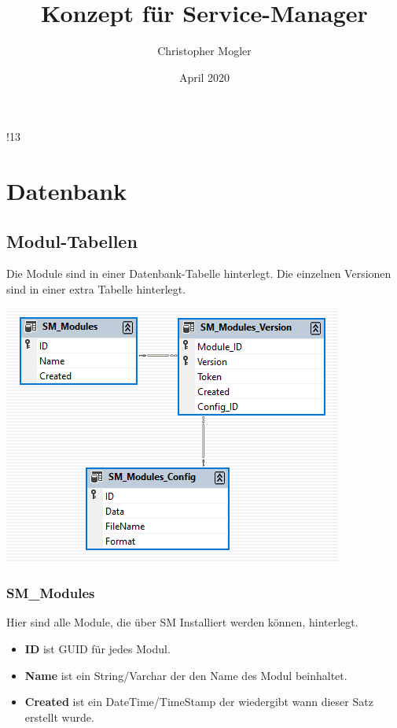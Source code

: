 \documentclass{article}
\title{Konzept für Service-Manager}
\author{Christopher Mogler}
\date{April 2020}
\begin{document}
\maketitle
\tableofcontentsFrankfurt!13

\newpage


\section{Datenbank}

\subsection{Modul-Tabellen}

Die Module sind in einer Datenbank-Tabelle hinterlegt. 
Die einzelnen Versionen sind in einer extra Tabelle hinterlegt.

\begin{center}
\includegraphics{db_modules}
\end{center}

\subsubsection{SM\_Modules}

Hier sind alle Module, die über SM Installiert werden können, hinterlegt.

\begin{itemize}
  \item \textbf{ID} ist GUID für jedes Modul.
  \item \textbf{Name} ist ein String/Varchar der den Name des Modul beinhaltet.
  \item \textbf{Created} ist ein DateTime/TimeStamp der wiedergibt wann dieser Satz erstellt wurde. 
\end{itemize}
\end{document}
